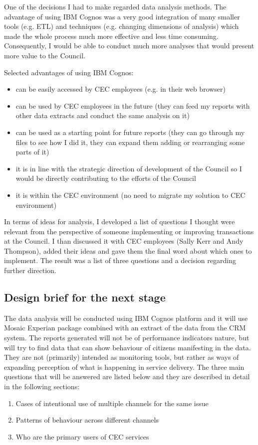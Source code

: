 One of the decisions I had to make regarded data analysis methods. The advantage of using IBM Cognos was a very good integration of many smaller tools (e.g. ETL) and techniques (e.g. changing dimensions of analysis) which made the whole process much more effective and less time consuming. Consequently, I would be able to conduct much more analyses that would present more value to the Council.

Selected advantages of using IBM Cognos:
\begin{itemize}
\item can be easily accessed by CEC employees (e.g. in their web browser)
\item can be used by CEC employees in the future (they can feed my reports with other data extracts and conduct the same analysis on it)
\item can be used as a starting point for future reports (they can go through my files to see how I did it, they can expand them adding or rearranging some parts of it)
\item it is in line with the strategic direction of development of the Council so I would be directly contributing to the efforts of the Council
\item it is within the CEC environment (no need to migrate my solution to CEC environment)
\end{itemize}

In terms of ideas for analysis, I developed a list of questions I thought were relevant from the perspective of someone implementing or improving transactions at the Council. I than discussed it with CEC employees (Sally Kerr and Andy Thompson), added their ideas and gave them the final word about which ones to implement. The result was a list of three questions and a decision regarding further direction.
		
		\subsection{Design brief for the next stage}
		
The data analysis will be conducted using IBM Cognos platform and it will use Mosaic Experian package combined with an extract of the data from the CRM system. The reports generated will not be of performance indicators nature, but will try to find data that can show behaviour of citizens manifesting in the data. They are not (primarily) intended as monitoring tools, but rather as ways of expanding perception of what is happening in service delivery. The three main questions that will be answered are listed below and they are described in detail in the following sections:
\begin{enumerate}
\item Cases of intentional use of multiple channels for the same issue
\item Patterns of behaviour across different channels
\item Who are the primary users of CEC services
\end{enumerate}
		

